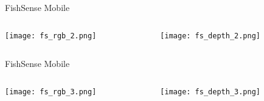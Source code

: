 \begin{frame}{FishSense Mobile}
     \begin{columns}
         \begin{column}{0.5\textwidth}
             \centering
             \texttt{[image: fs\_rgb\_2.png]}
         \end{column}
         \begin{column}{0.5\textwidth}
             \centering
             \texttt{[image: fs\_depth\_2.png]}
         \end{column}
     \end{columns}
\end{frame}

\begin{frame}{FishSense Mobile}
     \begin{columns}
         \begin{column}{0.5\textwidth}
             \centering
             \texttt{[image: fs\_rgb\_3.png]}
         \end{column}
         \begin{column}{0.5\textwidth}
             \centering
             \texttt{[image: fs\_depth\_3.png]}
         \end{column}
     \end{columns}
\end{frame}


